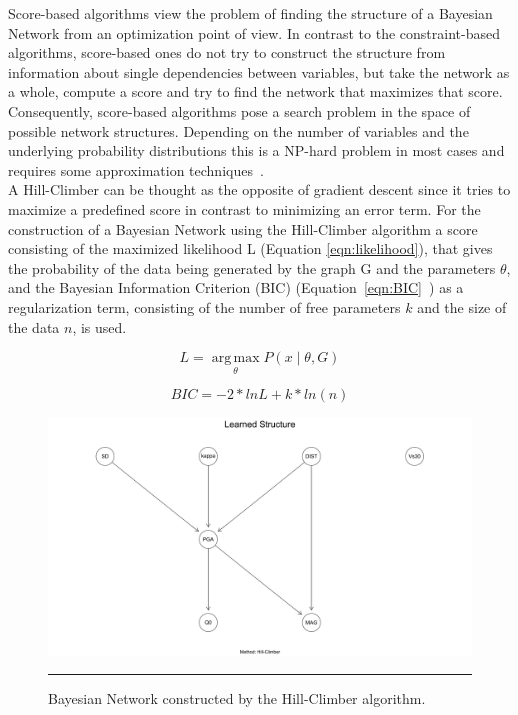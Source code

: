 Score-based algorithms view the problem of finding the structure of a Bayesian Network from an optimization point of view. In contrast to the constraint-based algorithms, score-based ones do not try to construct the structure from information about single dependencies between variables, but take the network as a whole, compute a score and try to find the network that maximizes that score. Consequently, score-based algorithms pose a search problem in the space of possible network structures. Depending on the number of variables and the underlying probability distributions this is a NP-hard problem in most cases and requires some approximation techniques~\citep{koller2009}.\\
A Hill-Climber can be thought as the opposite of gradient descent since it tries to maximize a predefined score in contrast to minimizing an error term. For the construction of a Bayesian Network using the Hill-Climber algorithm a score consisting of the maximized likelihood L (Equation \ref{eqn:likelihood}), that gives the probability of the data being generated by the graph G and the parameters $\theta$, and the Bayesian Information Criterion (BIC) (Equation~\ref{eqn:BIC}~\citep{schwarz}) as a regularization term, consisting of the number of free parameters $k$ and the size of the data $n$, is used.

\begin{equation}
L = \operatorname*{arg\,max}_\theta P(x\mid \theta, G)
\label{eqn:likelihood}
\end{equation}

\begin{equation}
BIC = -2*ln L + k* ln(n)
\label{eqn:BIC}
\end{equation}


\begin{figure}[htbp]%
	\centering
		\includegraphics[scale=0.33]{Figures/hc_one.pdf}
		\rule{35em}{0.5pt}
	\caption[Score-based Hill-Climber Network]{Bayesian Network constructed by the Hill-Climber algorithm.}
	\label{fig:hc}
\end{figure}

